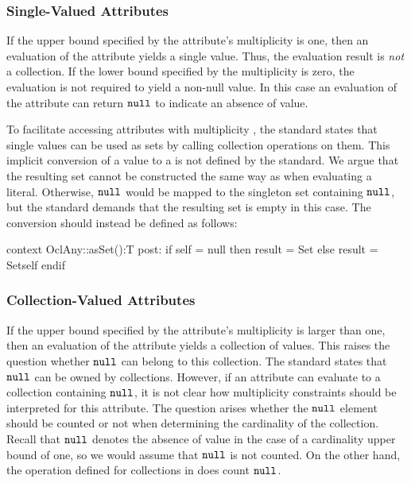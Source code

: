 \subsubsection{Single-Valued Attributes}\label{sec:single-valued-properties}
If the upper bound specified by the attribute's multiplicity is one,
then an evaluation of the attribute yields a single value.
Thus, the evaluation result is \emph{not} a collection. If the lower bound specified by the
multiplicity is zero, the evaluation is not required to yield a non-null value. In this case an
evaluation of the attribute can return $\mathtt{null}$ to indicate an
absence of value.

To facilitate accessing attributes with multiplicity , the \OCL
standard states that single values can be used as sets by calling collection
operations on them. This implicit conversion of a value to a
 is not defined by the standard. We argue that the resulting set
cannot be constructed the same way as when evaluating a 
literal. Otherwise, $\mathtt{null}$ would be mapped to the singleton set
containing $\mathtt{null}$, but the standard demands that
the resulting set is empty in this case. The conversion should instead
be defined as follows:
\begin{ocl}
context OclAny::asSet():T
  post: if self = null then result = Set{}
        else result = Set{self} endif
\end{ocl}

\subsubsection{Collection-Valued Attributes}\label{sec:collection-valued-properties}
If the upper bound specified by the attribute's multiplicity is larger than one,
then an evaluation of the attribute yields a collection of values.  This raises
the question whether $\mathtt{null}$ can belong to this collection. The \OCL
standard states that $\mathtt{null}$ can be owned by collections. However, if
an attribute can evaluate to a collection containing $\mathtt{null}$, it is not
clear how multiplicity constraints should be interpreted for this attribute. The
question arises whether the $\mathtt{null}$ element should be counted or not
when determining the cardinality of the collection. Recall that $\mathtt{null}$
denotes the absence of value in the case of a cardinality upper bound of one, so
we would assume that $\mathtt{null}$ is not counted. On the other hand, the
operation  defined for collections in \OCL does count
$\mathtt{null}$.

